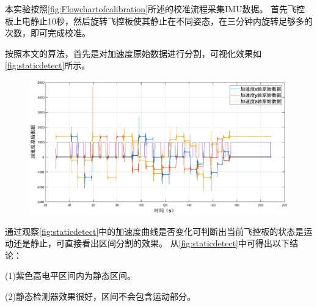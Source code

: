 \documentclass[
  type=master
]{gdutthesis}
\begin{document}
本实验按照\autoref{fig:Flowchartofcalibration}所述的校准流程采集IMU数据。
首先飞控板上电静止10秒，然后旋转飞控板使其静止在不同姿态，在三分钟内旋转足够多的次数，即可完成校准。

按照本文的算法，首先是对加速度原始数据进行分割，可视化效果如\autoref{fig:staticdetect}所示。
\begin{figure}[H]
	\centering
	\includegraphics[width=1.0\textwidth]{staticdetect3.eps}
	\label{fig:staticdetect}
\end{figure}
通过观察\autoref{fig:staticdetect}中的加速度曲线是否变化可判断出当前飞控板的状态是运动还是静止，可直接看出区间分割的效果。
从\autoref{fig:staticdetect}中可得出以下结论：

(1)紫色高电平区间内为静态区间。

(2)静态检测器效果很好，区间不会包含运动部分。
\end{document}
